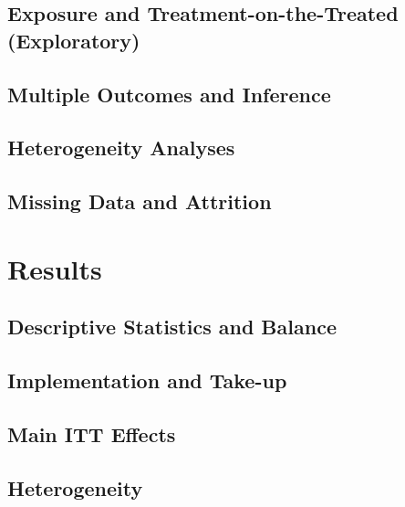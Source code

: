 \documentclass[12pt]{article}
\begin{document}
\subsection{Exposure and Treatment-on-the-Treated (Exploratory)}

\subsection{Multiple Outcomes and Inference}

\subsection{Heterogeneity Analyses}

\subsection{Missing Data and Attrition}

\section{Results}
\subsection{Descriptive Statistics and Balance}

\subsection{Implementation and Take-up}

\subsection{Main ITT Effects}

\subsection{Heterogeneity}
\end{document}
